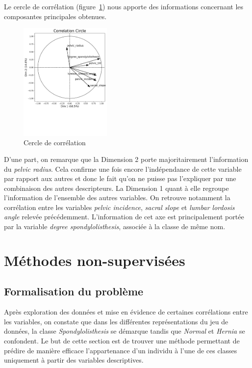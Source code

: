 \documentclass[twocolumn,10pt]{article}
\begin{document}
Le cercle de corrélation (figure~\ref{fig:correlation_circle_ACP}) nous apporte des informations concernant les composantes principales obtenues.

\begin{figure}[htbp]
    \begin{center}
        \includegraphics[trim=0 7cm 0 1cm, width=0.4\textwidth]{figures/correlation_circle_ACP.pdf}
        \caption{\label{fig:correlation_circle_ACP}Cercle de corrélation}
    \end{center}
\end{figure}

D'une part, on remarque que la Dimension 2 porte majoritairement l'information du \textit{pelvic radius}. Cela confirme une fois encore l'indépendance de cette variable par rapport aux autres et donc le fait qu'on ne puisse pas l'expliquer par une combinaison des autres descripteurs. La Dimension 1 quant à elle regroupe l'information de l'ensemble des autres variables. On retrouve notamment la corrélation entre les variables \textit{pelvic incidence}, \textit{sacral slope} et \textit{lumbar lordosis angle} relevée précédemment. L'information de cet axe est principalement portée par la variable \textit{degree spondylolisthesis}, associée à la classe de même nom.


\section{Méthodes non-supervisées}

\subsection{Formalisation du problème}

Après exploration des données et mise en évidence de certaines corrélations entre les variables, on constate que dans les différentes représentations du jeu de données, la classe \textit{Spondylolisthesis} se démarque tandis que \textit{Normal} et \textit{Hernia} se confondent. Le but de cette section est de trouver une méthode permettant de prédire de manière efficace l'appartenance d'un individu à l'une de ces classes uniquement à partir des variables descriptives.
\end{document}
